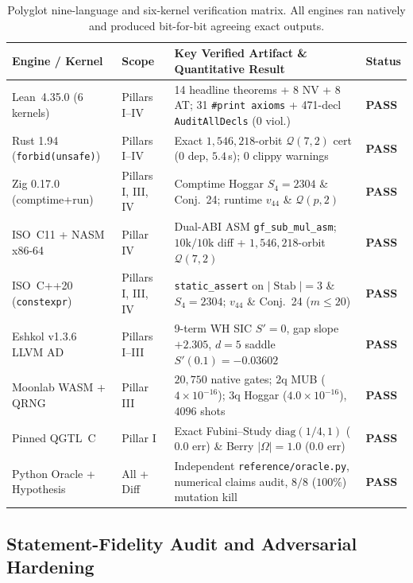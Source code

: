 \documentclass[11pt,letterpaper]{article}
\theoremstyle{plain}
\theoremstyle{definition}
\theoremstyle{remark}
\newcommand{\Stab}{\operatorname{Stab}}
\newcommand{\Qcode}{\mathcal{Q}}
\begin{document}
\begin{table}[t]
\centering
\caption{Polyglot nine-language and six-kernel verification matrix. All engines ran natively and produced bit-for-bit agreeing exact outputs.}
\label{tab:polyglot}
\footnotesize
\begin{tabularx}{\textwidth}{@{}llLl@{}}
\toprule
\textbf{Engine / Kernel} & \textbf{Scope} & \textbf{Key Verified Artifact \& Quantitative Result} & \textbf{Status} \\
\midrule
Lean~4.35.0 (6 kernels) & Pillars I--IV & 14 headline theorems + 8 NV + 8 AT; 31 \texttt{\#print axioms} + 471-decl \texttt{AuditAllDecls} ($0$ viol.) & \textbf{PASS} \\
Rust 1.94 (\texttt{forbid(unsafe)}) & Pillars I--IV & Exact $1{,}546{,}218$-orbit $\Qcode(7,2)$ cert ($0$ dep, $5.4$\,s); $0$ clippy warnings & \textbf{PASS} \\
Zig 0.17.0 (comptime+run) & Pillars I, III, IV & Comptime Hoggar $S_4=2304$ \& Conj.~24; runtime $v_{44}$ \& $\Qcode(p,2)$ & \textbf{PASS} \\
ISO~C11 + NASM x86-64 & Pillar IV & Dual-ABI ASM \texttt{gf\_sub\_mul\_asm}; $10\text{k}/10\text{k}$ diff + $1{,}546{,}218$-orbit $\Qcode(7,2)$ & \textbf{PASS} \\
ISO~C++20 (\texttt{constexpr}) & Pillars I, III, IV & \texttt{static\_assert} on $|\Stab|=3$ \& $S_4=2304$; $v_{44}$ \& Conj.~24 ($m\le 20$) & \textbf{PASS} \\
Eshkol v1.3.6 LLVM AD & Pillars I--III & 9-term WH SIC $S'=0$, gap slope $+2.305$, $d=5$ saddle $S'(0.1)=-0.03602$ & \textbf{PASS} \\
Moonlab WASM + QRNG & Pillar III & $20{,}750$ native gates; $2\text{q}$ MUB ($4\times 10^{-16}$); $3\text{q}$ Hoggar ($4.0\times 10^{-16}$), $4096$ shots & \textbf{PASS} \\
Pinned QGTL~C & Pillar I & Exact Fubini--Study $\mathrm{diag}(1/4,1)$ ($0.0$ err) \& Berry $|\Omega|=1.0$ ($0.0$ err) & \textbf{PASS} \\
Python Oracle + Hypothesis & All + Diff & Independent \texttt{reference/oracle.py}, numerical claims audit, $8/8$ ($100\%$) mutation kill & \textbf{PASS} \\
\bottomrule
\end{tabularx}
\end{table}

\subsection{Statement-Fidelity Audit and Adversarial Hardening}
\end{document}
